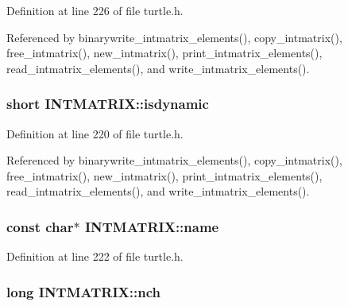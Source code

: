 Definition at line 226 of file turtle.\-h.



Referenced by binarywrite\-\_\-intmatrix\-\_\-elements(), copy\-\_\-intmatrix(), free\-\_\-intmatrix(), new\-\_\-intmatrix(), print\-\_\-intmatrix\-\_\-elements(), read\-\_\-intmatrix\-\_\-elements(), and write\-\_\-intmatrix\-\_\-elements().

\hypertarget{struct_i_n_t_m_a_t_r_i_x_a6f5ac0466cac944ab323b6f98a149997}{
\subsubsection[{isdynamic}]{\setlength{\rightskip}{0pt plus 5cm}short I\-N\-T\-M\-A\-T\-R\-I\-X\-::isdynamic}}\label{struct_i_n_t_m_a_t_r_i_x_a6f5ac0466cac944ab323b6f98a149997}


Definition at line 220 of file turtle.\-h.



Referenced by binarywrite\-\_\-intmatrix\-\_\-elements(), copy\-\_\-intmatrix(), free\-\_\-intmatrix(), new\-\_\-intmatrix(), print\-\_\-intmatrix\-\_\-elements(), read\-\_\-intmatrix\-\_\-elements(), and write\-\_\-intmatrix\-\_\-elements().

\hypertarget{struct_i_n_t_m_a_t_r_i_x_aaf60899cd1765633c636c834239d2f0e}{
\subsubsection[{name}]{\setlength{\rightskip}{0pt plus 5cm}const char$\ast$ I\-N\-T\-M\-A\-T\-R\-I\-X\-::name}}\label{struct_i_n_t_m_a_t_r_i_x_aaf60899cd1765633c636c834239d2f0e}


Definition at line 222 of file turtle.\-h.

\hypertarget{struct_i_n_t_m_a_t_r_i_x_a265642b24193f73afb7eb0886b5ccd48}{
\subsubsection[{nch}]{\setlength{\rightskip}{0pt plus 5cm}long I\-N\-T\-M\-A\-T\-R\-I\-X\-::nch}}\label{struct_i_n_t_m_a_t_r_i_x_a265642b24193f73afb7eb0886b5ccd48}


